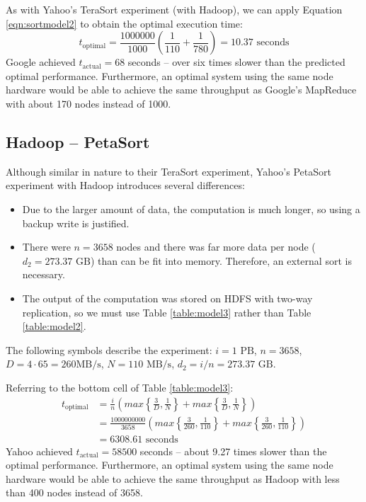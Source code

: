 \documentclass[ 11pt, letterpaper]{article}%
\begin{document}
As with Yahoo's TeraSort experiment (with Hadoop), we can apply Equation \ref{eqn:sortmodel2} to obtain the optimal execution time:
\[t_\text{optimal} = \frac{1000000}{1000} \left( \frac{1}{110} + \frac{1}{780}
\right) = 10.37 \text{ seconds}\]
Google achieved $t_\text{actual} = 68$
seconds -- over six times slower than the predicted optimal performance.
Furthermore, an optimal system using
the same node hardware would be able to achieve the same throughput as Google's
MapReduce with about 170 nodes instead of 1000.

\subsection{Hadoop -- PetaSort}
Although similar in nature to their TeraSort experiment, Yahoo's PetaSort experiment with Hadoop introduces several differences:
\begin{itemize}
  \item Due to the larger amount of data, the computation is much longer, so
  using a backup write is justified.
  \item There were $n = 3658$ nodes and there was far more data per node
  ($d_2 = 273.37 \text{ GB}$) than can be fit into memory. Therefore, an external sort is necessary.
  \item The output of the computation was stored on HDFS with two-way replication, so we must use Table \ref{table:model3} rather than Table \ref{table:model2}.
\end{itemize}

The following symbols describe
the experiment: $i = 1 \text{ PB}$, $n = 3658$, $D = 4 \cdot 65 = 260 \text{
MB/s}$, $N = 110 \text{ MB/s}$, $d_2 = i/n = 273.37 \text{ GB}$.

Referring to the bottom cell of Table \ref{table:model3}:
\begin{align*}
t_\text{optimal} &= \frac{i}{n} \left( max\left\{\frac{3}{D}, \frac{1}{N}\right\} + max\left\{\frac{3}{D}, \frac{1}{N}\right\} \right)\\
  &= \frac{1000000000}{3658} \left( max\left\{\frac{3}{260}, \frac{1}{110}\right\} + max\left\{\frac{3}{260}, \frac{1}{110}\right\} \right)\\
  &= 6308.61 \text{ seconds}
\end{align*}
Yahoo achieved $t_\text{actual} = 58500$ seconds -- about 9.27 times slower
than the optimal performance. Furthermore, an
optimal system using the same node hardware would be able to
achieve the same throughput as Hadoop with less than 400
nodes instead of 3658.
\end{document}
